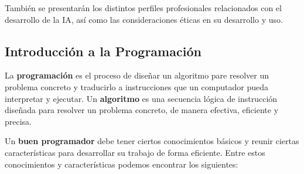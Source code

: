 También se presentarán los distintos perfiles profesionales relacionados con el desarrollo de la IA, así como las consideraciones éticas en su desarrollo y uso. 

\subsection{Introducción a la Programación}
La \textbf{programación} es el proceso de diseñar un algoritmo pare resolver un problema concreto y traducirlo a instrucciones que un computador pueda interpretar y ejecutar. Un \textbf{algoritmo} es una secuencia lógica de instrucción diseñada para resolver un problema concreto, de manera efectiva, eficiente y precisa.

Un \textbf{buen programador} debe tener ciertos conocimientos básicos y reunir ciertas características para desarrollar su trabajo de forma eficiente. Entre estos conocimientos y características podemos encontrar los siguientes:

